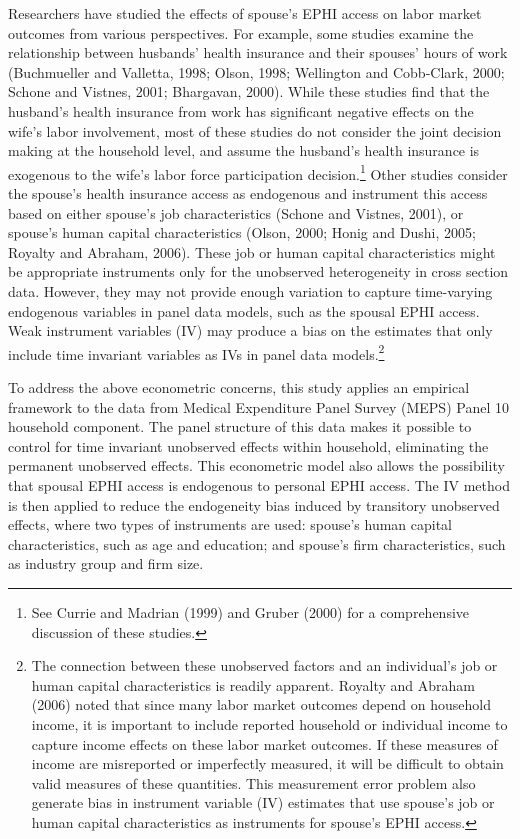\documentclass[legno,11pt]{article}
\begin{document}
Researchers have studied the effects of spouse's EPHI access on
labor market outcomes from various perspectives. For example, some
studies examine the relationship between husbands' health insurance
and their spouses' hours of work (Buchmueller and Valletta, 1998;
Olson, 1998; Wellington and Cobb-Clark, 2000; Schone and Vistnes,
2001; Bhargavan, 2000). While these studies find that the husband's
health insurance from work has significant negative effects on the
wife's labor involvement, most of these studies do not consider the
joint decision making at the household level, and assume the
husband's health insurance is exogenous to the wife's labor force
participation decision.\footnote{See Currie and Madrian (1999) and
Gruber (2000) for a comprehensive discussion of these studies.}
Other studies consider the spouse's health insurance access as
endogenous and instrument this access based on either spouse's job
characteristics (Schone and Vistnes, 2001), or spouse's human
capital characteristics (Olson, 2000; Honig and Dushi, 2005; Royalty
and Abraham, 2006). These job or human capital characteristics might
be appropriate instruments only for the unobserved heterogeneity in
cross section data. However, they may not provide enough variation
to capture time-varying endogenous variables in panel data models,
such as the spousal EPHI access. Weak instrument variables (IV) may
produce a bias on the estimates that only include time invariant
variables as IVs in panel data models.\footnote{The connection
between these unobserved factors and an individual's job or human
capital characteristics is readily apparent. Royalty and Abraham
(2006) noted that since many labor market outcomes depend on
household income, it is important to include reported household or
individual income to capture income effects on these labor market
outcomes. If these measures of income are misreported or imperfectly
measured, it will be difficult to obtain valid measures of these
quantities. This measurement error problem also generate bias in
instrument variable (IV) estimates that use spouse's job or human
capital characteristics as instruments for spouse's EPHI access.}
\par

To address the above econometric concerns, this study applies an
empirical framework to the data from Medical Expenditure Panel
Survey (MEPS) Panel 10 household component. The panel structure of
this data makes it possible to control for time invariant unobserved
effects within household, eliminating the permanent unobserved
effects. This econometric model also allows the possibility that
spousal EPHI access is endogenous to personal EPHI access.  The IV
method is then applied to reduce the endogeneity bias induced by
transitory unobserved effects, where two types of instruments are
used: spouse's human capital characteristics, such as age and
education; and spouse's firm characteristics, such as industry group
and firm size.
\par
\end{document}
